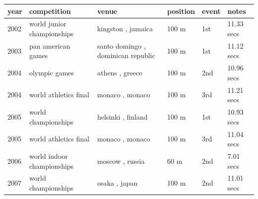 \documentclass{article}
\begin{document}
\begin{tabular}{llllll}
\toprule
year & competition & venue & position & event & notes \\
\midrule
2002 & world junior championships & kingston , jamaica & 100 m & 1st & 11.33 secs \\
2003 & pan american games & santo domingo , dominican republic & 100 m & 1st & 11.12 secs \\
2004 & olympic games & athens , greece & 100 m & 2nd & 10.96 secs \\
2004 & world athletics final & monaco , monaco & 100 m & 3rd & 11.21 secs \\
2005 & world championships & helsinki , finland & 100 m & 1st & 10.93 secs \\
2005 & world athletics final & monaco , monaco & 100 m & 3rd & 11.04 secs \\
2006 & world indoor championships & moscow , russia & 60 m & 2nd & 7.01 secs \\
2007 & world championships & osaka , japan & 100 m & 2nd & 11.01 secs \\
\bottomrule
\end{tabular}
\end{document}
